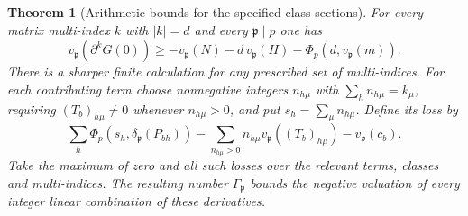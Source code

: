 \documentclass[a4paper,11pt]{article}
\newtheorem{theorem}[proposition]{Theorem}
\theoremstyle{definition}
\theoremstyle{remark}
\numberwithin{equation}{section}
\begin{document}
\begin{theorem}[Arithmetic bounds for the specified class sections]\leavevmode
\label{thm:classden312}
For every matrix multi-index \(k\) with \(|k|=d\) and every
\(\mathfrak p\mid p\) one has
\[
 v_{\mathfrak p}(\partial^k G(0))
 \ge -v_{\mathfrak p}(N)-d\,v_{\mathfrak p}(H)
                      -\Phi_p(d,v_{\mathfrak p}(m)).
\]
There is a sharper finite calculation for any prescribed set of
multi-indices. For each contributing term choose nonnegative
integers \(n_{h\mu}\) with \(\sum_h n_{h\mu}=k_\mu\), requiring
\((T_b)_{h\mu}\ne0\) whenever \(n_{h\mu}>0\), and put
\(s_h=\sum_\mu n_{h\mu}\). Define its loss by
\[
 \sum_h\Phi_p(s_h,\delta_{\mathfrak p}(P_{bh}))
   -\!\sum_{n_{h\mu}>0} n_{h\mu}v_{\mathfrak p}((T_b)_{h\mu})
   -v_{\mathfrak p}(c_b).
\]
Take the maximum of zero and all such losses over the relevant
terms, classes and multi-indices. The resulting number
\(\Gamma_{\mathfrak p}\) bounds the negative valuation of every
integer linear combination of these derivatives.
\end{theorem}
\end{document}
